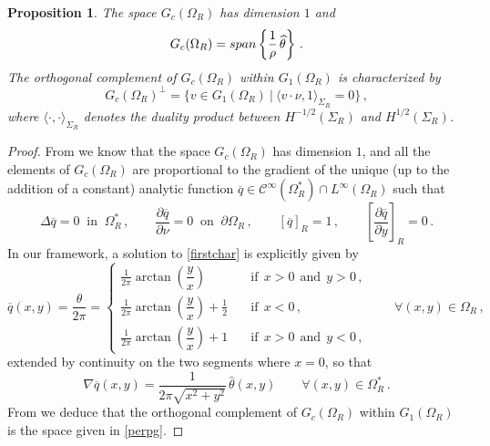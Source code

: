 \documentclass[a4paper,11pt]{article}
\newtheorem{proposition}[theorem]{Proposition}
\numberwithin{equation}{section}
\numberwithin{figure}{section}
\begin{document}
\begin{proposition}\label{foiastemam}
The space $G_{c}(\Omega_R)$ has dimension $1$ and
$$
G_{c}(\Omega_R) = \textup{span} \left\{ \dfrac{1}{\rho} \, \widehat{\theta} \right\} \, .
$$
The orthogonal complement of $G_{c}(\Omega_R)$ within $G_{1}(\Omega_R)$ is characterized by
\begin{equation} \label{perpg}
G_{c}(\Omega_R)^{\perp} = \{ v \in G_{1}(\Omega_R) \ | \ \langle v \cdot \nu , 1 \rangle_{\Sigma_{R}} = 0 \} \, ,
\end{equation}
where $\langle\cdot,\cdot\rangle_{\Sigma_{R}}$ denotes the duality product between $H^{-1/2}(\Sigma_{R})$ and $H^{1/2}(\Sigma_{R})$.
\end{proposition}
\noindent
\begin{proof} From \cite[Lemmas 1.1-1.2-1.3]{foiastemam78} we know that the space $G_{c}(\Omega_R)$ has dimension $1$, and all the elements of
$G_{c}(\Omega_R)$ are proportional to the gradient of the unique (up to the addition of a constant) analytic function $\overline{q} \in
\mathcal{C}^{\infty}(\Omega_R^*) \cap L^{\infty}(\Omega_R)$ such that
\begin{equation}\label{firstchar}
\Delta \overline{q}=0 \ \mbox{ in } \ \Omega_R^*\, ,\qquad
\frac{\partial \overline{q}}{\partial\nu}=0 \ \mbox{ on } \ \partial\Omega_R\, ,\qquad [\overline{q}]_{R} = 1\, ,\qquad \left[\frac{\partial
\overline{q}}{\partial y}\right]_{R} = 0 \, .
\end{equation}
In our framework, a solution to \eqref{firstchar} is explicitly given by
$$
\overline{q}(x,y) = \dfrac{\theta}{2 \pi} = \left\{
\begin{array}{ll}
\displaystyle\frac{1}{2\pi}\arctan \left( \dfrac{y}{x} \right) \quad & \text{if} \ \ x>0 \ \ \text{and} \ \ y>0   \, , \\[14pt]
\displaystyle\frac{1}{2\pi}\arctan \left( \dfrac{y}{x} \right) + \frac12 \quad & \text{if} \ \ x < 0  \, , \\[14pt]
\displaystyle\frac{1}{2\pi}\arctan \left( \dfrac{y}{x} \right) + 1 \quad & \text{if} \ \ x>0 \ \ \text{and} \ \ y<0 \, ,
\end{array}
\right.
\qquad \forall (x,y) \in \Omega_{R} \, ,
$$
extended by continuity on the two segments where $x=0$, so that
$$\nabla \overline{q}(x,y)= \frac{1}{2 \pi \sqrt{x^2 + y^2}} \, \widehat{\theta}(x,y) \qquad \forall (x,y) \in \Omega_{R}^*\, .$$
From \cite[Lemma 1.4]{foiastemam78} we deduce that the orthogonal complement of $G_{c}(\Omega_R)$ within $G_{1}(\Omega_R)$ is the space given in
\eqref{perpg}.
\end{proof}
\end{document}
